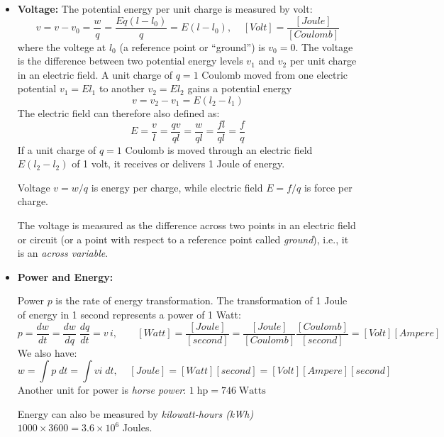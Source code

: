 \documentclass{article}
\begin{document}
\begin{itemize}
\item {\bf Voltage:} The potential energy per unit charge is measured
  by volt:
  \begin{equation} 
    v=v-v_0=\frac{w}{q}=\frac{Eq(l-l_0)}{q}=E(l-l_0),
    \;\;\;\;[Volt]=\frac{[Joule]}{[Coulomb]} 
  \end{equation}
  where the voltege at $l_0$ (a reference point or ``ground'') is $v_0=0$.
  The voltage is the difference between two potential energy levels $v_1$
  and $v_2$ per unit charge in an electric field. A unit charge of $q=1$
  Coulomb moved from one electric potential $v_1=El_1$ to another $v_2=El_2$
  gains a potential energy
  \begin{equation}
    v=v_2-v_1=E(l_2-l_1)
  \end{equation}
  The electric field can therefore also defined as:
  \begin{equation}
    E=\frac{v}{l}=\frac{qv}{ql}=\frac{w}{ql}=\frac{fl}{ql}=\frac{f}{q}
  \end{equation}
  If a unit charge of $q=1$ Coulomb is moved through an electric field 
  $E(l_2-l_2)$ of 1 volt, it receives or delivers 1 Joule of energy.

  Voltage $v=w/q$ is energy per charge, while electric field $E=f/q$ is 
  force per charge.

  The voltage is measured as the difference across two points in an 
  electric field or circuit (or a point with respect to a reference 
  point called {\em ground}), i.e., it is an {\em across variable}.

\item {\bf Power and Energy:}

  Power $p$ is the rate of energy transformation. The transformation 
  of 1 Joule of energy in 1 second represents a power of 1 Watt:
  \begin{equation}	
    p=\frac{dw}{dt}=\frac{dw}{dq} \; \frac{dq}{dt}=v\,i,
    \;\;\;\;\;\;\;[Watt]=\frac{[Joule]}{[second]}	
    =\frac{[Joule]}{[Coulomb]}\frac{[Coulomb]}{[second]}
    =[Volt][Ampere]
  \end{equation}
  We also have:
  \begin{equation}	
    w=\int p\;dt=\int vi\;dt,
    \;\;\;\;[Joule]=[Watt][second]=[Volt][Ampere][second]
  \end{equation}
  Another unit for power is {\em horse power}: 
  $1 \; \mbox{hp}=746 \; \mbox{Watts} $
  
  Energy can also be measured by {\em kilowatt-hours (kWh)} 
  $ 1000 \times 3600=3.6 \times 10^6 $ Joules.


\end{itemize}
\end{document}
